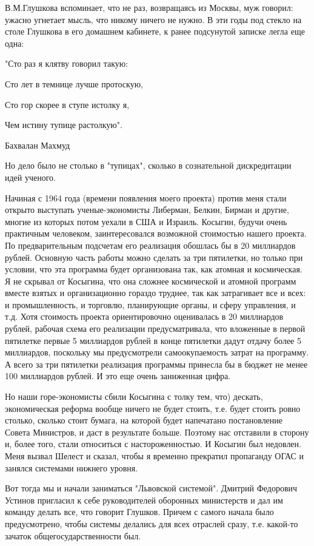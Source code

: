 В.М.Глушкова вспоминает, что не раз, возвращаясь из Москвы, муж говорил: ужасно
угнетает мысль, что никому ничего не нужно. В эти годы под стекло на столе
Глушкова в его домашнем кабинете, к ранее подсунутой записке легла еще одна:

\bigskip
"Сто раз я клятву говорил такую:

Сто лет в темнице лучше протоскую,

Сто гор скорее в ступе истолку я,

Чем истину тупице растолкую".

Бахвалан Махмуд
\bigskip

Но дело было не столько в "тупицах", сколько в сознательной дискредитации идей
ученого.

Начиная с 1964 года (времени появления моего проекта) против меня стали открыто
выступать ученые-экономисты Либерман, Белкин, Бирман и другие, многие из которых
потом уехали в США и Израиль. Косыгин, будучи очень практичным человеком,
заинтересовался возможной стоимостью нашего проекта. По предварительным
подсчетам его реализация обошлась бы в 20 миллиардов рублей. Основную часть
работы можно сделать за три пятилетки, но только при условии, что эта программа
будет организована так, как атомная и космическая. Я не скрывал от Косыгина, что
она сложнее космической и атомной программ вместе взятых и организационно
гораздо труднее, так как затрагивает все и всех: и промышленность, и торговлю,
планирующие органы, и сферу управления, и т.д. Хотя стоимость проекта
ориентировочно оценивалась в 20 миллиардов рублей, рабочая схема его реализации
предусматривала, что вложенные в первой пятилетке первые 5 миллиардов рублей в
конце пятилетки дадут отдачу более 5 миллиардов, поскольку мы предусмотрели
самоокупаемость затрат на программу. А всего за три пятилетки реализация
программы принесла бы в бюджет не менее 100 миллиардов рублей. И это еще очень
заниженная цифра.

Но наши горе-экономисты сбили Косыгина с толку тем, что) дескать, экономическая
реформа вообще ничего не будет стоить, т.е. будет стоить ровно столько, сколько
стоит бумага, на которой будет напечатано постановление Совета Министров, и даст
в результате больше. Поэтому нас отставили в сторону и, более того, стали
относиться с настороженностью. И Косыгин был недовлен. Меня вызвал Шелест и
сказал, чтобы я временно прекратил пропаганду ОГАС и занялся системами нижнего
уровня.

Вот тогда мы и начали заниматься "Львовской системой". Дмитрий Федорович Устинов
пригласил к себе руководителей оборонных министерств и дал им команду делать
все, что говорит Глушков. Причем с самого начала было предусмотрено, чтобы
системы делались для всех отраслей сразу, т.е. какой-то зачаток
общегосударственности был.

